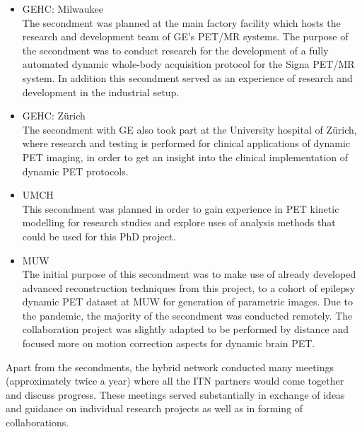 \begin{itemize}
    \item GEHC: Milwaukee \\
    The secondment was planned at the main factory facility which hosts the research and development team of GE's PET/MR systems. The purpose of the secondment was to conduct research for the development of a fully automated dynamic whole-body acquisition protocol for the Signa PET/MR system.
    In addition this secondment served as an experience of research and development in the industrial setup.
    \item GEHC: Zürich \\
    The secondment with GE also took part at the University hospital of Zürich, where research and testing is performed for clinical applications of dynamic PET imaging, in order to get an insight into the clinical implementation of dynamic PET protocols.
    \item UMCH \\
    This secondment was planned in order to gain experience in PET kinetic modelling for research studies and explore uses of analysis methods that could be used for this PhD project. 
    \item MUW \\
    The initial purpose of this secondment was to make use of already developed advanced reconstruction techniques from this project, to a cohort of epilepsy dynamic PET dataset at MUW for generation of parametric images. Due to the pandemic, the majority of the secondment was conducted remotely. The collaboration project was slightly adapted to be performed by distance and focused more on motion correction aspects for dynamic brain PET.
\end{itemize}

Apart from the secondments, the \gls{hybrid} network conducted many meetings (approximately twice a year) where all the ITN partners would come together and discuss progress. These meetings served substantially in exchange of ideas and guidance on individual research projects as well as in forming of collaborations. 

